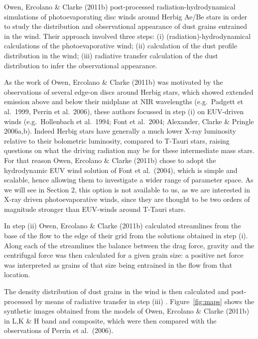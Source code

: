 \documentclass[10pt,fleqn,twoside]{article}
\begin{document}
Owen, Ercolano \& Clarke (2011b) post-processed
radiation-hydrodynamical simulations of photoevaporating disc winds
around Herbig Ae/Be stars in order to study the distribution and
observational appearance of dust grains entrained in the wind. Their
approach involved three steps: (i) (radiation)-hydrodynamical
calculations of the photoevaporative wind; (ii) calculation of the
dust profile distribution in the wind; (iii) radiative transfer
calculation of the dust distribution to infer the observational
appearance. 

As the work of Owen, Ercolano \& Clarke (2011b) was motivated by the
observations of several edge-on discs around Herbig stars, which
showed extended emission above and below their midplane at NIR
wavelengths (e.g.\ Padgett et al.\ 1999, Perrin et al.\ 2006), these
authors focussed in step (i)  on EUV-driven winds (e.g.\ Hollenbach et al.\ 1994;
Font et al.\ 2004; Alexander, Clarke \& Pringle 2006a,b). Indeed Herbig
stars have generally a much lower X-ray luminosity relative to their
bolometric luminosity, compared to T-Tauri stars, raising questions on
what the driving radiation may be for these intermediate mass stars. For
that reason Owen, Ercolano \& Clarke (2011b) chose to adopt the
hydrodynamic EUV wind solution of Font et al.\ (2004), which is simple and
scalable, hence allowing them to investigate a wider range of
parameter space. As we will see in Section 2, this option is not
available to us, as we are interested in X-ray driven
photoevaporative winds, since they are thought to be two orders of
magnitude stronger than EUV-winds around T-Tauri
stars. 

In step (ii) Owen, Ercolano \& Clarke (2011b) calculated streamlines
from the base of the flow to the edge of their grid from the solutions
obtained in step (i). Along each of the streamlines the balance
between the drag force, gravity and the centrifugal force was then
calculated for a given grain size: a positive net force was interpreted
as grains of that size being entrained in the flow from that
location. 

The density distribution of dust grains in the wind is
then calculated and post-processed by means of radiative
transfer in step (iii) . Figure~\ref{fig:maps} shows the synthetic images 
obtained from the models of Owen, Ercolano \& Clarke (2011b) in L,K \&
H band and composite, which were then compared 
with the observations of Perrin et al.\ (2006). 
\end{document}
